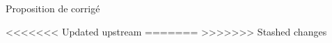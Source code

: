 
\vspace{0.1cm}
\begin{huge}
 Proposition de corrigé
\end{huge}



<<<<<<< Updated upstream
=======
>>>>>>> Stashed changes





